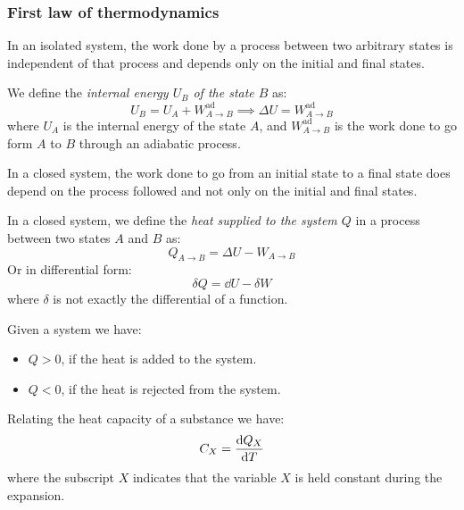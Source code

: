 \documentclass[../../../main.tex]{subfiles}
\begin{document}
\begin{multicols}{2}
    \subsubsection{First law of thermodynamics}
    \begin{law}
        In an isolated system, the work done by a process between two arbitrary states is independent of that process and depends only on the initial and final states.
    \end{law}
    \begin{corollary}
        We define the \textit{internal energy $U_B$ of the state $B$} as:
        $$U_B=U_A+W_{A\to B}^\text{ad}\implies \Delta U=W_{A\to B}^\text{ad}$$
        where $U_A$ is the internal energy of the state $A$, and $W_{A\to B}^\text{ad}$ is the work done to go form $A$ to $B$ through an adiabatic process.
    \end{corollary}
    \begin{law}
        In a closed system, the work done to go from an initial state to a final state does depend on the process followed and not only on the initial and final states.
    \end{law}
    \begin{corollary}
        In a closed system, we define the \textit{heat supplied to the system $Q$} in a process between two states $A$ and $B$ as:
        $$Q_{A\to B}=\Delta U-W_{A\to B}$$
        Or in differential form:
        $$\delta Q=\dd U-\delta W$$
        where $\delta$ is not exactly the differential of a function.
    \end{corollary}
    \begin{lemma}
        Given a system we have:
        \begin{itemize}
            \item $Q>0$, if the heat is added to the system.
            \item $Q<0$, if the heat is rejected from the system.
        \end{itemize}
    \end{lemma}
    \begin{definition}
        Relating the heat capacity of a substance we have: $$C_X=\dv{Q_X}{T}$$
        where the subscript $X$ indicates that the variable $X$ is held constant during the expansion.
    \end{definition}
    \begin{definition}

\end{definition}
\end{multicols}
\end{document}
